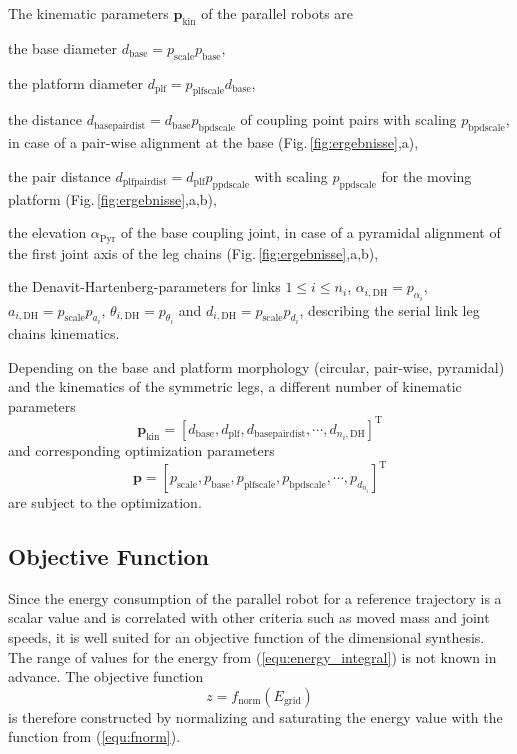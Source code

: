 \documentclass[fleqn,a4paper,10pt]{article}
\newcommand{\bm}[1]{\mathbf{#1}}
\newcommand{\transp}[0]{{\mathrm{T}}}
\begin{document}
\begin{multicols}{2}
The kinematic parameters $\bm{p}_\mathrm{kin}$ of the parallel robots are
%
\begin{compactitem}
\item the base diameter $d_\mathrm{base}=p_\mathrm{scale} p_\mathrm{base}$,
\item the platform diameter $d_\mathrm{plf}=p_\mathrm{plfscale} d_\mathrm{base}$,
\item the distance $d_\mathrm{basepairdist}=d_\mathrm{base} p_\mathrm{bpdscale}$ of coupling point pairs with scaling $p_\mathrm{bpdscale}$, in case of a pair-wise alignment at the base (Fig.\,\ref{fig:ergebnisse},a),
\item the pair distance $d_\mathrm{plfpairdist}=d_\mathrm{plf} p_\mathrm{ppdscale}$ with scaling $p_\mathrm{ppdscale}$ for the moving platform (Fig.\,\ref{fig:ergebnisse},a,b),
\item the elevation $\alpha_\mathrm{Pyr}$ of the base coupling joint, in case of a pyramidal alignment of the first joint axis of the leg chains (Fig.\,\ref{fig:ergebnisse},a,b),
\item the Denavit-Hartenberg-parameters for links $1\le i \le n_i$, $\alpha_{i,\mathrm{DH}}=p_{\alpha_i}$, $a_{i,\mathrm{DH}}=p_\mathrm{scale} p_{a_i}$, $\theta_{i,\mathrm{DH}}=p_{\theta_i}$ and $d_{i,\mathrm{DH}}=p_\mathrm{scale} p_{d_i}$, describing the serial link leg chains kinematics.
\end{compactitem}
%
Depending on the base and platform morphology (circular, pair-wise, pyramidal) and the kinematics of the symmetric legs, a different number of kinematic parameters
%
\begin{equation}
\bm{p}_\mathrm{kin}=[d_\mathrm{base}, d_\mathrm{plf}, d_\mathrm{basepairdist}, \cdots, d_{{n_i},\mathrm{DH}} ]^\transp %
\end{equation}
%
and corresponding optimization parameters
%
\begin{equation}
\bm{p}=[p_\mathrm{scale}, p_\mathrm{base}, p_\mathrm{plfscale}, p_\mathrm{bpdscale}, \cdots, p_{d_{n_i}}]^\transp
\end{equation}
%
are subject to the optimization.

\subsection{Objective Function}
\label{sec:opt_objective}

Since the energy consumption of the parallel robot for a reference trajectory is a scalar value and is correlated with other criteria such as moved mass and joint speeds, it is well suited for an objective function of the dimensional synthesis.
The range of values for the energy from (\ref{equ:energy_integral}) is not known in advance.
The objective function
%
\begin{equation}
z=f_\mathrm{norm}(E_{\mathrm{grid}})
\end{equation}
%
is therefore constructed by normalizing and saturating the energy value with the function from (\ref{equ:fnorm}).



\end{multicols}
\end{document}

